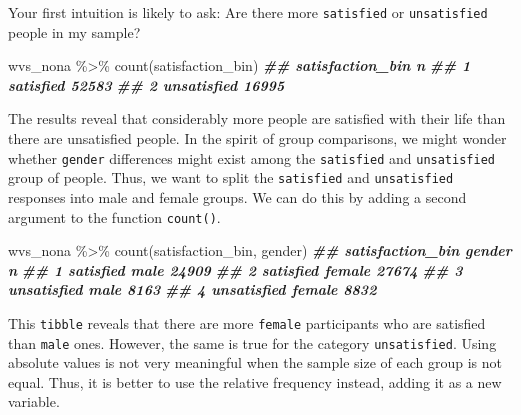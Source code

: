 \documentclass[
]{book}
\newenvironment{Shaded}{\begin{snugshade}}{\end{snugshade}}
\newcommand{\DocumentationTok}[1]{\textcolor[rgb]{0.56,0.35,0.01}{\textbf{\textit{#1}}}}
\newcommand{\FunctionTok}[1]{\textcolor[rgb]{0.00,0.00,0.00}{#1}}
\newcommand{\NormalTok}[1]{#1}
\newcommand{\SpecialCharTok}[1]{\textcolor[rgb]{0.00,0.00,0.00}{#1}}
\begin{document}
Your first intuition is likely to ask: Are there more \texttt{satisfied} or \texttt{unsatisfied} people in my sample?

\begin{Shaded}
\begin{Highlighting}[]
\NormalTok{wvs\_nona }\SpecialCharTok{\%\textgreater{}\%} \FunctionTok{count}\NormalTok{(satisfaction\_bin)}
\DocumentationTok{\#\#   satisfaction\_bin     n}
\DocumentationTok{\#\# 1        satisfied 52583}
\DocumentationTok{\#\# 2      unsatisfied 16995}
\end{Highlighting}
\end{Shaded}

The results reveal that considerably more people are satisfied with their life than there are unsatisfied people. In the spirit of group comparisons, we might wonder whether \texttt{gender} differences might exist among the \texttt{satisfied} and \texttt{unsatisfied} group of people. Thus, we want to split the \texttt{satisfied} and \texttt{unsatisfied} responses into male and female groups. We can do this by adding a second argument to the function \texttt{count()}.

\begin{Shaded}
\begin{Highlighting}[]
\NormalTok{wvs\_nona }\SpecialCharTok{\%\textgreater{}\%} \FunctionTok{count}\NormalTok{(satisfaction\_bin, gender)}
\DocumentationTok{\#\#   satisfaction\_bin gender     n}
\DocumentationTok{\#\# 1        satisfied   male 24909}
\DocumentationTok{\#\# 2        satisfied female 27674}
\DocumentationTok{\#\# 3      unsatisfied   male  8163}
\DocumentationTok{\#\# 4      unsatisfied female  8832}
\end{Highlighting}
\end{Shaded}

This \texttt{tibble} reveals that there are more \texttt{female} participants who are satisfied than \texttt{male} ones. However, the same is true for the category \texttt{unsatisfied}. Using absolute values is not very meaningful when the sample size of each group is not equal. Thus, it is better to use the relative frequency instead, adding it as a new variable.
\end{document}
